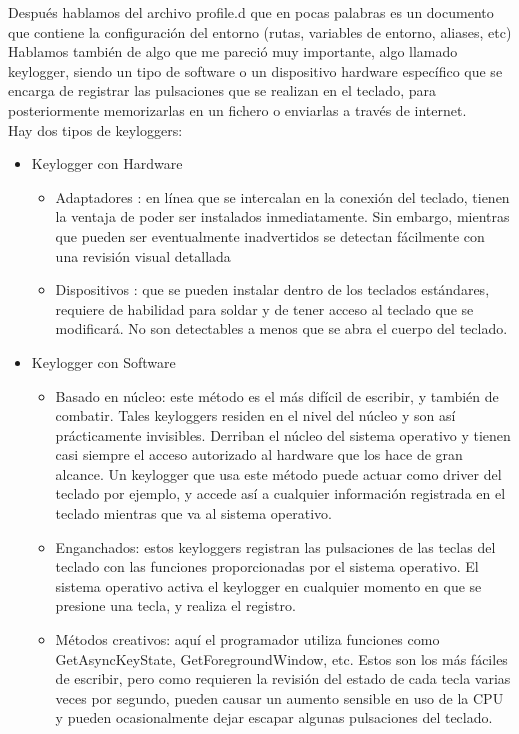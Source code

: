 \documentclass[11pt, a4paper]{report}
\begin{document}
Después hablamos del archivo profile.d que en pocas palabras es un documento
que contiene la configuración del entorno (rutas, variables de entorno,
aliases, etc) \\

Hablamos también de algo que me pareció muy importante, algo llamado keylogger,
siendo un tipo de software o un dispositivo hardware específico que se encarga
de registrar las pulsaciones que se realizan en el teclado, para posteriormente
memorizarlas en un fichero o enviarlas a través de internet. \\

Hay dos tipos de keyloggers:

\begin{itemize}
\item Keylogger con Hardware
  \begin{itemize}
  \item Adaptadores : en línea que se intercalan en la conexión del
    teclado, tienen la ventaja de poder ser instalados inmediatamente.
    Sin embargo, mientras que pueden ser eventualmente inadvertidos se
    detectan fácilmente con una revisión visual detallada
  \item Dispositivos : que se pueden instalar dentro de los teclados
    estándares, requiere de habilidad para soldar y de tener acceso al
    teclado que se modificará. No son detectables a menos que se abra el
    cuerpo del teclado.
  \end{itemize}
\item Keylogger con Software
  \begin{itemize}
  \item Basado en núcleo: este método es el más difícil de escribir, y
    también de combatir. Tales keyloggers residen en el nivel del núcleo
    y son así prácticamente invisibles. Derriban el núcleo del sistema
    operativo y tienen casi siempre el acceso autorizado al hardware que
    los hace de gran alcance. Un keylogger que usa este método puede
    actuar como driver del teclado por ejemplo, y accede así a cualquier
    información registrada en el teclado mientras que va al sistema
    operativo.
  \item Enganchados: estos keyloggers registran las pulsaciones de las
    teclas del teclado con las funciones proporcionadas por el sistema
    operativo. El sistema operativo activa el keylogger en cualquier
    momento en que se presione una tecla, y realiza el registro.
  \item Métodos creativos: aquí el programador utiliza funciones como
    GetAsyncKeyState, GetForegroundWindow, etc. Estos son los más fáciles
    de escribir, pero como requieren la revisión del estado de cada tecla
    varias veces por segundo, pueden causar un aumento sensible en uso de
    la CPU y pueden ocasionalmente dejar escapar algunas pulsaciones del
    teclado.

  \end{itemize}
  
\end{itemize}
\end{document}
